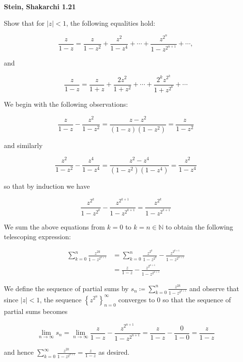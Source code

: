 \textbf{Stein, Shakarchi 1.21}

Show that for $|z| < 1$, the following equalities hold:

$$
\frac{z}{1 - z} = \frac{z}{1 - z^2} + \frac{z^2}{1 - z^4} + \cdots + \frac{z^{2^n}}{1 - z^{2^{n+1}}} + \cdots,
$$

and 

$$
\frac{z}{1 - z} = \frac{z}{1 + z} + \frac{2z^2}{1 + z^2} + \cdots + \frac{2^k z^{2^k}}{1 + z^{2^k}} + \cdots
$$

\begin{solution}
    We begin with the following observations:

    $$
        \frac{z}{1 - z} - \frac{z^2}{1 - z^2} = \frac{z - z^2}{(1 - z)(1 - z^2)} = \frac{z}{1 - z^2}
    $$

    and similarly

    $$
        \frac{z^2}{1 - z^2} - \frac{z^4}{1 - z^4} = \frac{z^2 - z^4}{(1 - z^2)(1 - z^4)} = \frac{z^2}{1 - z^4}
    $$

    so that by induction we have

    $$
        \frac{z^{2^k}}{1 - z^{2^k}} - \frac{z^{2^{k+1}}}{1 - z^{2^{k+1}}} = \frac{z^{2^k}}{1 - z^{2^{k+1}}}
    $$

    We sum the above equations from $k = 0$ to $k = n \in \mathbb{N}$ to obtain the following telescoping expression:

    \begin{align*}
        \sum\limits_{k=0}^{n} \frac{z^{2k}}{1 - z^{2^{n+1}}} &= \sum\limits_{k=0}^{n} \frac{z^{2^k}}{1 - z^{2^k}} - \frac{z^{2^{k+1}}}{1 - z^{2^{n+1}}} \\
                                                             &= \frac{z}{1 - z} - \frac{z^{2^{n+1}}}{1 - z^{2^{n+1}}}
    \end{align*}

    We define the sequence of partial sums by $s_n \coloneqq \sum\limits_{k=0}^{n} \frac{z^{2k}}{1 - z^{2^{k+1}}}$ and 
    observe that since $|z| < 1$, the sequence $\left\{ z^{2^n} \right\}_{n=0}^{\infty}$ converges to $0$ so that the 
    sequence of partial sums becomes

    $$
    \lim\limits_{n \to \infty} s_n = \lim\limits_{n \to \infty} \frac{z}{1 - z} - \frac{z^{2^{n+1}}}{1 - z^{2^{n+1}}} = \frac{z}{1 - z} - \frac{0}{1 - 0} = \frac{z}{1 - z}
    $$

    and hence $\sum\limits_{k=0}^{\infty} \frac{z^{2k}}{1 - z^{2^{k+1}}} = \frac{z}{1 - z}$ as desired.


\end{solution}
